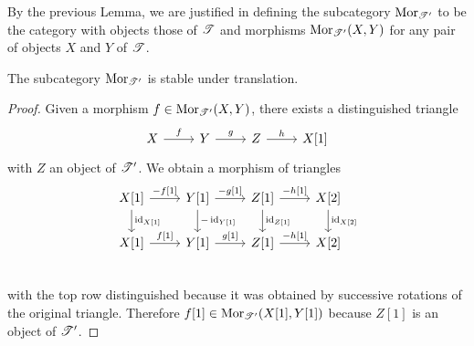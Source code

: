 \documentclass[dissertation.tex]{subfiles}
\begin{document}
\begin{defn}
  By the previous Lemma, we are justified in defining the subcategory $\operatorname{Mor}_{\mathscr{T}^\prime}$ to be the category with objects those of $\mathscr{T}$ and morphisms $\operatorname{Mor}_{\mathscr{T}^\prime}(X,Y)$ for any pair of objects $X$ and $Y$ of $\mathscr{T}$.
\end{defn}

\begin{lem}
  The subcategory $\operatorname{Mor}_{\mathscr{T}^\prime}$ is stable under translation.
  
  \begin{proof}
    Given a morphism $f \in \operatorname{Mor}_{\mathscr{T}^\prime}(X,Y)$, there exists a distinguished triangle
    $$\begin{tikzcd}
      X \arrow{r}{f} & Y \arrow{r}{g} & Z \arrow{r}{h} & X[1]
    \end{tikzcd}$$
    with $Z$ an object of $\mathscr{T}^\prime$.
    We obtain a morphism of triangles
    $$\begin{tikzcd}
      X[1] \arrow{r}{-f[1]}\arrow{d}{\id_{X[1]}} & Y[1]\arrow{d}{-\id_{Y[1]}} \arrow{r}{-g[1]} & Z[1] \arrow{r}{-h[1]}\arrow{d}{\id_{Z[1]}} & X[2]\arrow{d}{\id_{X[2]}}\\
      X[1] \arrow{r}{f[1]} & Y[1] \arrow{r}{g[1]} & Z[1] \arrow{r}{-h[1]} & X[2]\\
    \end{tikzcd}$$
    with the top row distinguished because it was obtained by successive rotations of the original triangle.
    Therefore $f[1] \in \operatorname{Mor}_{\mathscr{T}^\prime}(X[1], Y[1])$ because $Z[1]$ is an object of $\mathscr{T}^\prime$.
  \end{proof}
\end{lem}
\end{document}
